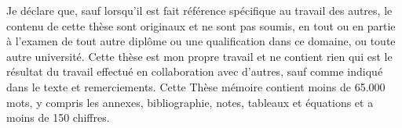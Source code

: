 
\begin{declaration}


Je déclare que, sauf lorsqu'il est fait référence spécifique au travail des autres, 
le contenu de cette thèse sont originaux et ne sont pas soumis, 
en tout ou en partie à l'examen de tout autre diplôme ou une qualification dans ce domaine, 
ou toute autre université. 
Cette thèse est mon propre travail et ne contient rien qui est le résultat du travail effectué en collaboration avec d'autres,
sauf comme indiqué dans le texte et remerciements. 
Cette Thèse mémoire contient moins de 65.000 mots, y compris les annexes, bibliographie, notes, tableaux et équations et a moins de 150 chiffres.


\end{declaration}


